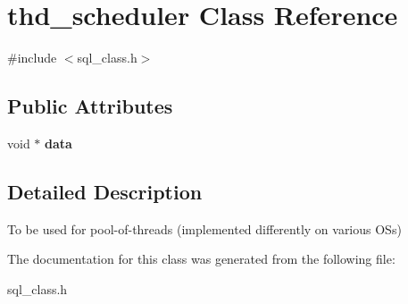 \hypertarget{classthd__scheduler}{}\section{thd\+\_\+scheduler Class Reference}
\label{classthd__scheduler}


{\ttfamily \#include $<$sql\+\_\+class.\+h$>$}

\subsection*{Public Attributes}
\begin{DoxyCompactItemize}
\item 
\mbox{\label{classthd__scheduler_a4f6594bdef996f0d8b68ae7f442d6a99}} 
void $\ast$ {\bfseries data}
\end{DoxyCompactItemize}


\subsection{Detailed Description}
To be used for pool-\/of-\/threads (implemented differently on various O\+Ss) 

The documentation for this class was generated from the following file\+:\begin{DoxyCompactItemize}
\item 
sql\+\_\+class.\+h\end{DoxyCompactItemize}
